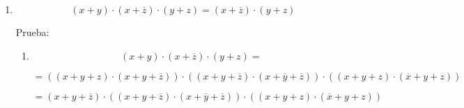\begin{enumerate}
\begin{enumerate}
\begin{enumerate}
\begin{enumerate}
        Prueba:

        \begin{enumerate}
        \def\labelenumv{\arabic{enumv}.}
        \item
          \[{{\left( {x \cdot y} \right) + \left( {x \cdot \overline{z}} \right)} + \left( {y \cdot z} \right)} =\]

          \[= {{\left( {\left( {{x \cdot y} \cdot z} \right) + \left( {{x \cdot y} \cdot \overline{z}} \right)} \right) + \left( {\left( {{x \cdot y} \cdot \overline{z}} \right) + \left( {{x \cdot \overline{y}} \cdot \overline{z}} \right)} \right)} + \left( {\left( {{x \cdot y} \cdot z} \right) + \left( {{\overline{x} \cdot y} \cdot z} \right)} \right)}\]

          \[= {{\left( {{x \cdot y} \cdot \overline{z}} \right) + \left( {\left( {{x \cdot y} \cdot \overline{z}} \right) + \left( {{x \cdot \overline{y}} \cdot \overline{z}} \right)} \right)} + \left( {\left( {{x \cdot y} \cdot z} \right) + \left( {{\overline{x} \cdot y} \cdot z} \right)} \right)}\]

          \[= {\left( {\left( {{x \cdot y} \cdot \overline{z}} \right) + \left( {{x \cdot \overline{y}} \cdot \overline{z}} \right)} \right) + \left( {\left( {{x \cdot y} \cdot z} \right) + \left( {{\overline{x} \cdot y} \cdot z} \right)} \right)}\]

          \[= {\left( {x \cdot \overline{z}} \right) + \left( {y \cdot z} \right)}\]
        \end{enumerate}
      \item
        \[{{\left( {x + y} \right) \cdot \left( {x + \overline{z}} \right)} \cdot \left( {y + z} \right)} = {\left( {x + \overline{z}} \right) \cdot \left( {y + z} \right)}\]

        Prueba:

        \begin{enumerate}
        \def\labelenumv{\arabic{enumv}.}
        \item
          \[{{\left( {x + y} \right) \cdot \left( {x + \overline{z}} \right)} \cdot \left( {y + z} \right)} =\]

          \[= {{\left( {\left( {{x + y} + z} \right) \cdot \left( {{x + y} + \overline{z}} \right)} \right) \cdot \left( {\left( {{x + y} + \overline{z}} \right) \cdot \left( {{x + \overline{y}} + \overline{z}} \right)} \right)} \cdot \left( {\left( {{x + y} + z} \right) \cdot \left( {{\overline{x} + y} + z} \right)} \right)}\]

          \[= {{\left( {{x + y} + \overline{z}} \right) \cdot \left( {\left( {{x + y} + \overline{z}} \right) \cdot \left( {{x + \overline{y}} + \overline{z}} \right)} \right)} \cdot \left( {\left( {{x + y} + z} \right) \cdot \left( {{\overline{x} + y} + z} \right)} \right)}\]


\end{enumerate}
\end{enumerate}
\end{enumerate}
\end{enumerate}
\end{enumerate}
